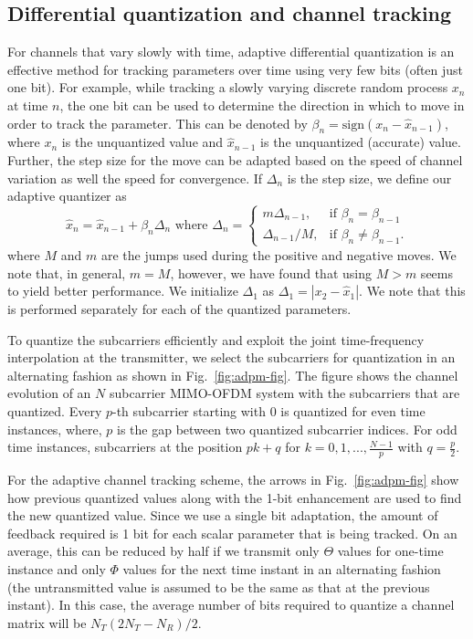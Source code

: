 \documentclass[conference]{IEEEtran}
\begin{document}
\subsection{Differential quantization and channel tracking}
\label{quantiz}
For channels that vary slowly with time, adaptive differential
quantization is an effective method for tracking parameters over time
using very few bits (often just one bit). For example, while tracking
a slowly varying discrete random process $x_n$ at time $n$, the one
bit can be used to determine the direction in which to move in order
to track the parameter. This can be denoted by
$\beta_{n} = \mbox{sign}(x_{n} - \hat{x}_{n-1})$, where $x_n$ is the
unquantized value and $\hat{x}_{n-1}$ is the unquantized (accurate)
value. Further, the step size for the move can be adapted based on the
speed of channel variation as well the speed for convergence. If
$\Delta_n$ is the step size, we define our adaptive quantizer as
\begin{equation}
\hat{x}_{n} = \hat{x}_{n-1} + \beta_{n}\Delta_{n} \mbox{ where }
\label{delta_eqn}
\Delta_{n} = \begin{cases}
    m \Delta_{n-1}, & \text{if $\beta_{n} = \beta_{n-1}$}\\
    \Delta_{n-1}/M , & \text{if $\beta_{n} \neq \beta_{n-1}$}.
  \end{cases}
\end{equation}
where $M$ and $m$ are the jumps used during the positive and negative
moves. We note that, in general, $m = M$, however, we have found that
using $M > m$ seems to yield better performance. We initialize
$\Delta_1$ as $\Delta_1 = |x_{2}-\hat{x}_1|$. We note that this is
performed separately for each of the quantized parameters.

To quantize the subcarriers efficiently and exploit the joint
time-frequency interpolation at the transmitter, we select the
subcarriers for quantization in an alternating fashion as shown in
Fig.~\ref{fig:adpm-fig}. The figure shows the channel evolution of an
$N$ subcarrier MIMO-OFDM system with the subcarriers that are
quantized. Every $p$-th subcarrier starting with $0$ is quantized for
even time instances, where, $p$ is the gap between two quantized
subcarrier indices. For odd time instances, subcarriers at the
position $pk+q$ for $k = 0,1,..., \frac{N-1}{p}$ with $q =
{\frac{p}{2}}$.

For the adaptive channel tracking scheme, the arrows in
Fig.~\ref{fig:adpm-fig} show how previous quantized values along with
the 1-bit enhancement are used to find the new quantized value. Since
we use a single bit adaptation, the amount of feedback required is 1
bit for each scalar parameter that is being tracked. On an average,
this can be reduced by half if we transmit only $\Theta$ values for
one-time instance and only $\Phi$ values for the next time instant in
an alternating fashion (the untransmitted value is assumed to be the
same as that at the previous instant). In this case, the average
number of bits required to quantize a channel matrix will be
$N_{T}(2N_{T} - N_{R})/2$.
\end{document}

